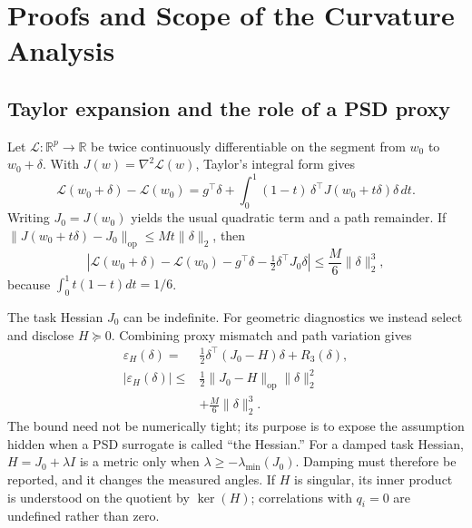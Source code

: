 \section{Proofs and Scope of the Curvature Analysis}
\label{app:theory-proofs}

\subsection{Taylor expansion and the role of a PSD proxy}

Let $\mathcal{L}:\mathbb{R}^p\rightarrow\mathbb{R}$ be twice
continuously differentiable on the segment from $w_0$ to
$w_0+\delta$.  With $J(w)=\nabla^2\mathcal{L}(w)$, Taylor's integral
form gives
\begin{equation}
\label{eq:integral-taylor}
\mathcal{L}(w_0+\delta)-\mathcal{L}(w_0)
=g^\top\delta+
\int_0^1(1-t)\,\delta^\top J(w_0+t\delta)\delta\,dt.
\end{equation}
Writing $J_0=J(w_0)$ yields the usual quadratic term and a path
remainder.  If
$\|J(w_0+t\delta)-J_0\|_{\mathrm{op}}\le Mt\|\delta\|_2$, then
\begin{equation}
\left|\mathcal{L}(w_0+\delta)-\mathcal{L}(w_0)
-g^\top\delta-\tfrac12\delta^\top J_0\delta\right|
\le \frac{M}{6}\|\delta\|_2^3,
\end{equation}
because $\int_0^1t(1-t)dt=1/6$.

The task Hessian $J_0$ can be indefinite.  For geometric diagnostics we
instead select and disclose $H\succeq0$.  Combining proxy mismatch and
path variation gives
\begin{equation}
\label{eq:proxy-error-bound}
\begin{split}
\varepsilon_H(\delta)
={}&\tfrac12\delta^\top(J_0-H)\delta+R_3(\delta),\\
|\varepsilon_H(\delta)|
\le{}&\tfrac12\|J_0-H\|_{\mathrm{op}}\|\delta\|_2^2\\
&+\tfrac{M}{6}\|\delta\|_2^3.
\end{split}
\end{equation}
The bound need not be numerically tight; its purpose is to expose the
assumption hidden when a PSD surrogate is called ``the Hessian.''  For
a damped task Hessian, $H=J_0+\lambda I$ is a metric only when
$\lambda\ge-\lambda_{\min}(J_0)$.  Damping must therefore be reported,
and it changes the measured angles.  If $H$ is singular, its inner
product is understood on the quotient by $\ker(H)$; correlations with
$q_i=0$ are undefined rather than zero.

